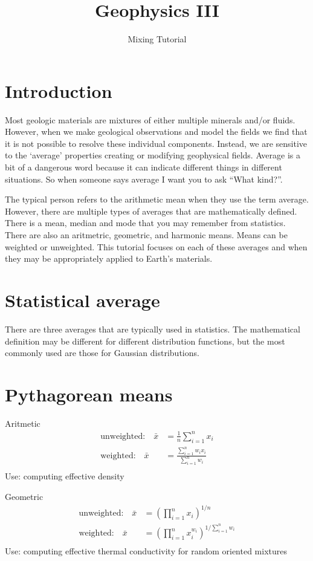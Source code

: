 \documentclass[final,a4paper,12pt]{article}
\title{Geophysics III}
\author{Mixing Tutorial}
\date{}
\theoremstyle{definition}
\begin{document}
\maketitle

\section{Introduction}
Most geologic materials are mixtures of either multiple minerals and/or fluids.
However, when we make geological observations and model the fields we find that
it is not possible to resolve these individual components.  Instead, we are
sensitive to the `average' properties creating or modifying geophysical fields.
Average is a bit of a dangerous word because it can indicate different things in
different situations.  So when someone says average I want you to ask ``What
kind?''.

The typical person refers to the arithmetic mean when they use the term average.
However, there are multiple types of averages that are mathematically defined.
There is a mean, median and mode that you may remember from statistics.  There
are also an aritmetric, geometric, and harmonic means.  Means can be weighted or
unweighted.  This tutorial focuses on each of these averages and when they may
be appropriately applied to Earth's materials.

\section{Statistical average}
There are three averages that are typically used in statistics.  The
mathematical definition may be different for different distribution functions,
but the most commonly used are those for Gaussian distributions.

\section{Pythagorean means}

Aritmetic
\begin{align}
    \text{unweighted:} \quad \bar{x} &= \frac{1}{n} \sum_{i=1}^{n} x_i \\
    \text{weighted:} \quad
        \bar{x} &= \frac{\sum_{i=1}^{n} w_i x_i}{\sum_{i=1}^{n} w_i} \\
\end{align}
Use: computing effective density

Geometric
\begin{align}
    \text{unweighted:} \quad \bar{x} &= \left( \prod_{i=1}^{n} x_i \right)^{1/n} \\
    \text{weighted:} \quad \bar{x} &= 
        \left( \prod_{i=1}^{n} x_i^{w_i} \right)^{1/\sum_{i=1}^{n} w_i} \\
\end{align}
Use: computing effective thermal conductivity for random oriented mixtures
\end{document}
